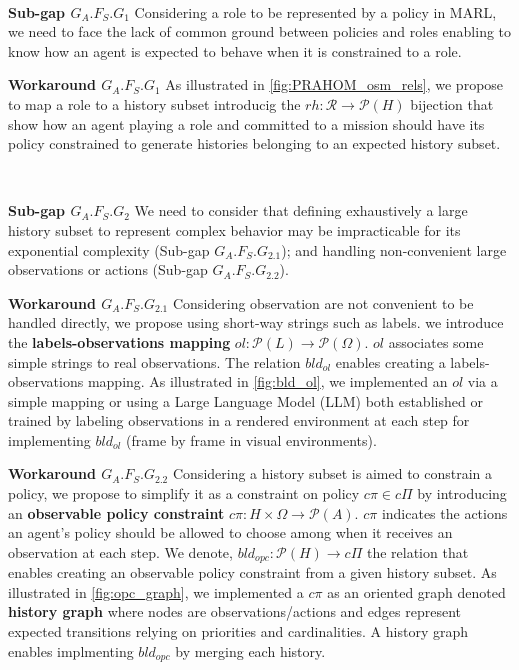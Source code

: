 \documentclass[runningheads]{llncs}
\newcounter{relation}
\begin{document}
\

\textbf{Sub-gap $G_A.F_S.G_1$} \quad Considering a role to be represented by a policy in MARL, we need to face the lack of common ground between policies and roles enabling to know how an agent is expected to behave when it is constrained to a role.

\textbf{Workaround $G_A.F_S.G_1$} \quad As illustrated in \autoref{fig:PRAHOM_osm_rels}, we propose to map a role to a history subset introducig the $rh: \mathcal{R} \rightarrow \mathcal{P}(H)$ bijection that show how an agent playing a role and committed to a mission should have its policy constrained to generate histories belonging to an expected history subset.

\

\textbf{Sub-gap $G_A.F_S.G_2$} \quad We need to consider that defining exhaustively a large history subset to represent complex behavior may be impracticable for its exponential complexity (Sub-gap $G_A.F_S.G_{2.1}$); and handling non-convenient large observations or actions (Sub-gap $G_A.F_S.G_{2.2}$).

\textbf{Workaround $G_A.F_S.G_{2.1}$} \quad Considering observation are not convenient to be handled directly, we propose using short-way strings such as labels. we introduce the \textbf{labels-observations mapping} $ol: \mathcal{P}(L) \rightarrow \mathcal{P}(\Omega)$. $ol$ associates some simple strings to real observations. The relation $bld_{ol}$ enables creating a labels-observations mapping. As illustrated in \autoref{fig:bld_ol}, we implemented an $ol$ via a simple mapping or using a Large Language Model (LLM) both established or trained by labeling observations in a rendered environment at each step for implementing $bld_{ol}$ (frame by frame in visual environments).

\textbf{Workaround $G_A.F_S.G_{2.2}$} \quad Considering a history subset is aimed to constrain a policy, we propose to simplify it as a constraint on policy $c\pi \in c\Pi$ by introducing an \textbf{observable policy constraint} $c\pi: H \times \Omega \rightarrow \mathcal{P}(A)$. $c\pi$ indicates the actions an agent's policy should be allowed to choose among when it receives an observation at each step. We denote, $bld_{opc}: \mathcal{P}(H) \rightarrow c\Pi$ the relation that enables creating an observable policy constraint from a given history subset.
As illustrated in \autoref{fig:opc_graph}, we implemented a $c\pi$ as an oriented graph denoted \textbf{history graph} where nodes are observations/actions and edges represent expected transitions relying on priorities and cardinalities. A history graph enables implmenting $bld_{opc}$ by merging each history.
\end{document}
